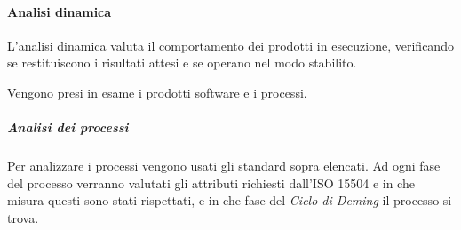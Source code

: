 			\paragraph{Analisi dinamica}
				L'analisi dinamica valuta il comportamento dei prodotti in esecuzione, verificando se restituiscono i risultati attesi e se operano nel modo stabilito.
				
				Vengono presi in esame i prodotti software e i processi.
				
				\subparagraph*{Analisi dei processi}
				Per analizzare i processi vengono usati gli standard sopra elencati. Ad ogni fase del processo verranno valutati gli attributi richiesti dall'ISO 15504 e in che misura questi sono stati rispettati, e in che fase del \textit{Ciclo di Deming} il processo si trova.
			
	
	
	
	
	
